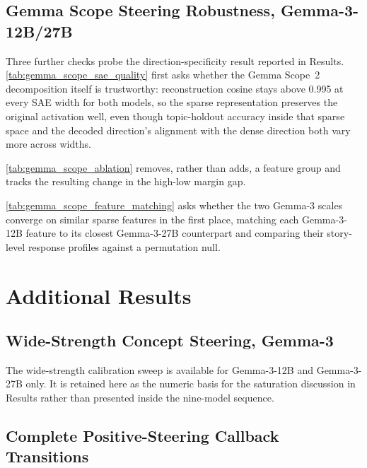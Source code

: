 \documentclass[twocolumn]{article}
\newcommand{\tabledir}{../../results/tables}
\begin{document}
\begin{appendices}
\subsection*{Gemma Scope Steering Robustness, Gemma-3-12B/27B}

Three further checks probe the direction-specificity result reported in
Results. \autoref{tab:gemma_scope_sae_quality} first asks whether the
Gemma Scope~2 decomposition itself is trustworthy: reconstruction cosine
stays above 0.995 at every SAE width for both models, so the sparse
representation preserves the original activation well, even though
topic-holdout accuracy inside that sparse space and the decoded direction's
alignment with the dense direction both vary more across widths.



\autoref{tab:gemma_scope_ablation} removes, rather than adds, a feature
group and tracks the resulting change in the high-low margin gap.



\autoref{tab:gemma_scope_feature_matching} asks whether the two Gemma-3
scales converge on similar sparse features in the first place, matching
each Gemma-3-12B feature to its closest Gemma-3-27B counterpart and
comparing their story-level response profiles against a permutation null.



\section*{Additional Results}

\subsection*{Wide-Strength Concept Steering, Gemma-3}

The wide-strength calibration sweep is available for Gemma-3-12B and
Gemma-3-27B only. It is retained here as the numeric basis for the saturation
discussion in Results rather than presented inside the nine-model sequence.



\subsection*{Complete Positive-Steering Callback Transitions}


\end{appendices}
\end{document}
